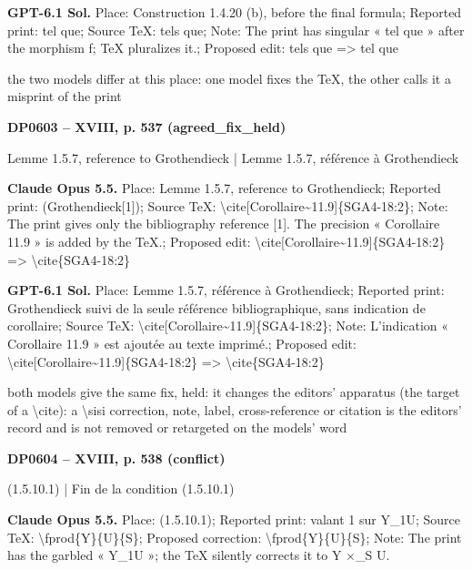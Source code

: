 \textbf{GPT-6.1 Sol.} Place: Construction 1.4.20 (b), before the final formula; Reported print: tel que; Source TeX: tels que; Note: The print has singular « tel que » after the morphism f; TeX pluralizes it.; Proposed edit: tels que =\allowbreak > tel que\par
the two models differ at this place: one model fixes the TeX, the other calls it a misprint of the print\par
\par\noindent\hypertarget{DP0603}{}\textbf{DP0603 -- XVIII, p. 537 (agreed\_fix\_held)}\par
Lemme 1.5.7, reference to Grothendieck | Lemme 1.5.7, référence à Grothendieck\par
\textbf{Claude Opus 5.5.} Place: Lemme 1.5.7, reference to Grothendieck; Reported print: (Grothendieck[1]); Source TeX: \textbackslash{}cite[Corollaire\textasciitilde{}11.9]\{SGA4-18:2\}; Note: The print gives only the bibliography reference [1]. The precision « Corollaire 11.9 » is added by the TeX.; Proposed edit: \textbackslash{}cite[Corollaire\textasciitilde{}11.9]\{SGA4-18:2\} =\allowbreak > \textbackslash{}cite\{SGA4-18:2\}\par
\textbf{GPT-6.1 Sol.} Place: Lemme 1.5.7, référence à Grothendieck; Reported print: Grothendieck suivi de la seule référence bibliographique, sans indication de corollaire; Source TeX: \textbackslash{}cite[Corollaire\textasciitilde{}11.9]\{SGA4-18:2\}; Note: L'indication « Corollaire 11.9 » est ajoutée au texte imprimé.; Proposed edit: \textbackslash{}cite[Corollaire\textasciitilde{}11.9]\{SGA4-18:2\} =\allowbreak > \textbackslash{}cite\{SGA4-18:2\}\par
both models give the same fix, held: it changes the editors' apparatus (the target of a \textbackslash{}cite): a \textbackslash{}sisi correction, note, label, cross-reference or citation is the editors' record and is not removed or retargeted on the models' word\par
\par\noindent\hypertarget{DP0604}{}\textbf{DP0604 -- XVIII, p. 538 (conflict)}\par
(1.5.10.1) | Fin de la condition (1.5.10.1)\par
\textbf{Claude Opus 5.5.} Place: (1.5.10.1); Reported print: valant 1 sur Y\_1U; Source TeX: \textbackslash{}fprod\{Y\}\{U\}\{S\}; Proposed correction: \textbackslash{}fprod\{Y\}\{U\}\{S\}; Note: The print has the garbled « Y\_1U »; the TeX silently corrects it to Y \ensuremath{\times}\_S U.\par
